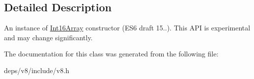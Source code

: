 \subsection{Detailed Description}
An instance of \hyperlink{classv8_1_1_int16_array}{Int16\+Array} constructor (E\+S6 draft 15..). This A\+P\+I is experimental and may change significantly. 

The documentation for this class was generated from the following file\+:\begin{DoxyCompactItemize}
\item 
deps/v8/include/v8.\+h\end{DoxyCompactItemize}
